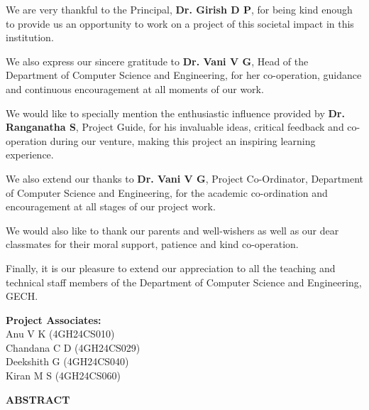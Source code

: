 \documentclass[12pt,a4paper]{report}
\begin{document}
We are very thankful to the Principal, \textbf{Dr. Girish D P}, for being kind enough to provide us an opportunity to work on a project of this societal impact in this institution.

We also express our sincere gratitude to \textbf{Dr. Vani V G}, Head of the Department of Computer Science and Engineering, for her co-operation, guidance and continuous encouragement at all moments of our work.

We would like to specially mention the enthusiastic influence provided by \textbf{Dr. Ranganatha S}, Project Guide, for his invaluable ideas, critical feedback and co-operation during our venture, making this project an inspiring learning experience.

We also extend our thanks to \textbf{Dr. Vani V G}, Project Co-Ordinator, Department of Computer Science and Engineering, for the academic co-ordination and encouragement at all stages of our project work.

We would also like to thank our parents and well-wishers as well as our dear classmates for their moral support, patience and kind co-operation.

Finally, it is our pleasure to extend our appreciation to all the teaching and technical staff members of the Department of Computer Science and Engineering, GECH.

\vspace{0.8cm}
\hfill \textbf{Project Associates:}\\[0.2cm]
\null \hfill Anu V K (4GH24CS010)\\
\null \hfill Chandana C D (4GH24CS029)\\
\null \hfill Deekshith G (4GH24CS040)\\
\null \hfill Kiran M S (4GH24CS060)
\newpage

\begin{center}
  \textbf{\Large ABSTRACT}\\[0.6cm]
\end{center}
\end{document}
